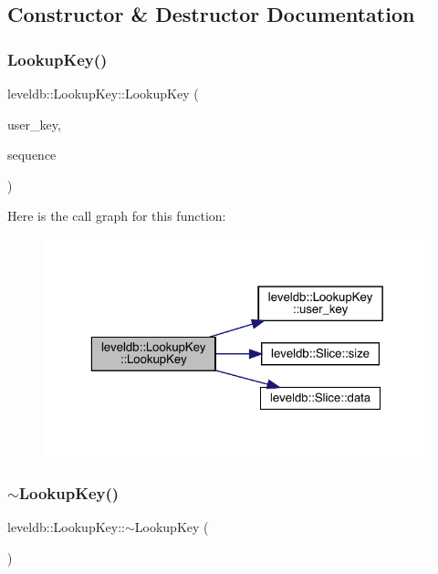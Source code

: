 \subsection{Constructor \& Destructor Documentation}
\mbox{\label{classleveldb_1_1_lookup_key_acd09aa56607ced962e1b458d05d53472}} 
\subsubsection{\texorpdfstring{LookupKey()}{LookupKey()}}
{\footnotesize\ttfamily leveldb\+::\+Lookup\+Key\+::\+Lookup\+Key (\begin{DoxyParamCaption}\item[{const \mbox{\hyperlink{classleveldb_1_1_slice}{Slice}} \&}]{user\+\_\+key,  }\item[{\mbox{\hyperlink{namespaceleveldb_a5481ededd221c36d652c371249f869fa}{Sequence\+Number}}}]{sequence }\end{DoxyParamCaption})}

Here is the call graph for this function\+:
\nopagebreak
\begin{figure}[H]
\begin{center}
\leavevmode
\includegraphics[width=323pt]{classleveldb_1_1_lookup_key_acd09aa56607ced962e1b458d05d53472_cgraph}
\end{center}
\end{figure}
\mbox{\label{classleveldb_1_1_lookup_key_a1ed5751c159540217aa5d702fdf83a98}} 
\subsubsection{\texorpdfstring{$\sim$LookupKey()}{~LookupKey()}}
{\footnotesize\ttfamily leveldb\+::\+Lookup\+Key\+::$\sim$\+Lookup\+Key (\begin{DoxyParamCaption}{ }\end{DoxyParamCaption})\hspace{0.3cm}{\ttfamily [inline]}}



